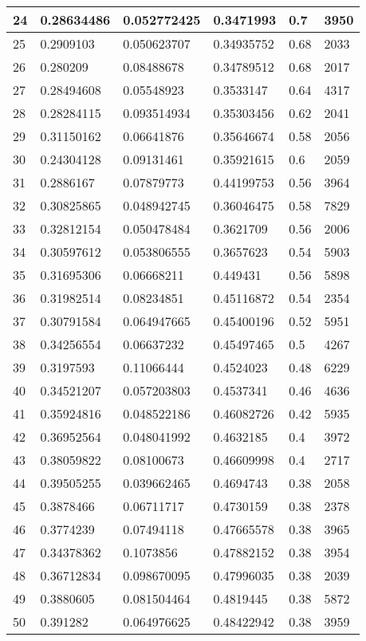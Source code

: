 \begin{longtable}{|l|l|l|l|l|l|}
24 & 0.28634486 & 0.052772425 & 0.3471993 & 0.7 & 3950 \\ \hline 
25 & 0.2909103 & 0.050623707 & 0.34935752 & 0.68 & 2033 \\ \hline 
26 & 0.280209 & 0.08488678 & 0.34789512 & 0.68 & 2017 \\ \hline 
27 & 0.28494608 & 0.05548923 & 0.3533147 & 0.64 & 4317 \\ \hline 
28 & 0.28284115 & 0.093514934 & 0.35303456 & 0.62 & 2041 \\ \hline 
29 & 0.31150162 & 0.06641876 & 0.35646674 & 0.58 & 2056 \\ \hline 
30 & 0.24304128 & 0.09131461 & 0.35921615 & 0.6 & 2059 \\ \hline 
31 & 0.2886167 & 0.07879773 & 0.44199753 & 0.56 & 3964 \\ \hline 
32 & 0.30825865 & 0.048942745 & 0.36046475 & 0.58 & 7829 \\ \hline 
33 & 0.32812154 & 0.050478484 & 0.3621709 & 0.56 & 2006 \\ \hline 
34 & 0.30597612 & 0.053806555 & 0.3657623 & 0.54 & 5903 \\ \hline 
35 & 0.31695306 & 0.06668211 & 0.449431 & 0.56 & 5898 \\ \hline 
36 & 0.31982514 & 0.08234851 & 0.45116872 & 0.54 & 2354 \\ \hline 
37 & 0.30791584 & 0.064947665 & 0.45400196 & 0.52 & 5951 \\ \hline 
38 & 0.34256554 & 0.06637232 & 0.45497465 & 0.5 & 4267 \\ \hline 
39 & 0.3197593 & 0.11066444 & 0.4524023 & 0.48 & 6229 \\ \hline 
40 & 0.34521207 & 0.057203803 & 0.4537341 & 0.46 & 4636 \\ \hline 
41 & 0.35924816 & 0.048522186 & 0.46082726 & 0.42 & 5935 \\ \hline 
42 & 0.36952564 & 0.048041992 & 0.4632185 & 0.4 & 3972 \\ \hline 
43 & 0.38059822 & 0.08100673 & 0.46609998 & 0.4 & 2717 \\ \hline 
44 & 0.39505255 & 0.039662465 & 0.4694743 & 0.38 & 2058 \\ \hline 
45 & 0.3878466 & 0.06711717 & 0.4730159 & 0.38 & 2378 \\ \hline 
46 & 0.3774239 & 0.07494118 & 0.47665578 & 0.38 & 3965 \\ \hline 
47 & 0.34378362 & 0.1073856 & 0.47882152 & 0.38 & 3954 \\ \hline 
48 & 0.36712834 & 0.098670095 & 0.47996035 & 0.38 & 2039 \\ \hline 
49 & 0.3880605 & 0.081504464 & 0.4819445 & 0.38 & 5872 \\ \hline 
50 & 0.391282 & 0.064976625 & 0.48422942 & 0.38 & 3959 \\ \hline 
\end{longtable}